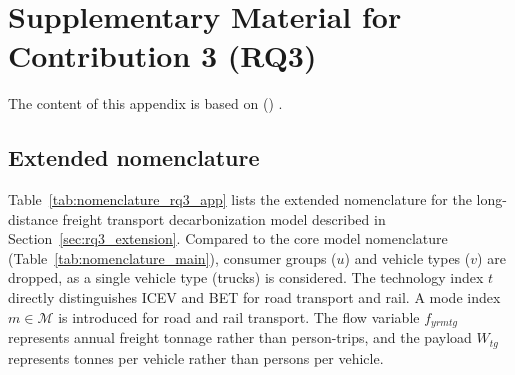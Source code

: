 \chapter{Supplementary Material for Contribution 3 (RQ3)}\label{app:rq3}

The content of this appendix is based on \citeauthor{GOLAB2026SpatialTruck} (\citeyear{GOLAB2026SpatialTruck}) \cite{GOLAB2026SpatialTruck}.

\section{Extended nomenclature}\label{app:rq3_nomenclature}

Table~\ref{tab:nomenclature_rq3_app} lists the extended nomenclature for the long-distance freight transport decarbonization model described in Section~\ref{sec:rq3_extension}. Compared to the core model nomenclature (Table~\ref{tab:nomenclature_main}), consumer groups ($u$) and vehicle types ($v$) are dropped, as a single vehicle type (trucks) is considered. The technology index $t$ directly distinguishes ICEV and BET for road transport and rail. A mode index $m \in \mathcal{M}$ is introduced for road and rail transport. The flow variable $f_{yrmtg}$ represents annual freight tonnage rather than person-trips, and the payload $W_{tg}$ represents tonnes per vehicle rather than persons per vehicle.

